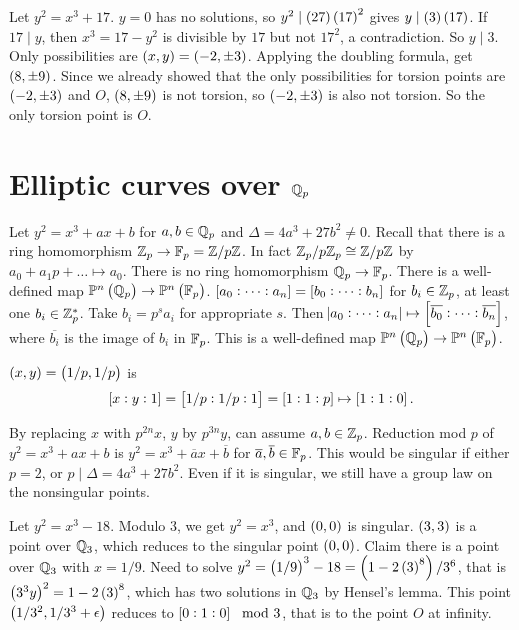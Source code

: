 \begin{example*}
Let $ y^2 = x^3 + 17 $. $ y = 0 $ has no solutions, so $ y^2 \mid \br{27}\br{17}^2 $ gives $ y \mid \br{3}\br{17} $. If $ 17 \mid y $, then $ x^3 = 17 - y^2 $ is divisible by $ 17 $ but not $ 17^2 $, a contradiction. So $ y \mid 3 $. Only possibilities are $ \br{x, y} = \br{-2, \pm 3} $. Applying the doubling formula, get $ \br{8, \pm 9} $. Since we already showed that the only possibilities for torsion points are $ \br{-2, \pm 3} $ and $ O $, $ \br{8, \pm 9} $ is not torsion, so $ \br{-2, \pm 3} $ is also not torsion. So the only torsion point is $ O $.
\end{example*}

\pagebreak

\section{Elliptic curves over $ \mathbb{Q}_p $}


Let $ y^2 = x^3 + ax + b $ for $ a, b \in \mathbb{Q}_p $ and $ \Delta = 4a^3 + 27b^2 \ne 0 $. Recall that there is a ring homomorphism $ \mathbb{Z}_p \to \mathbb{F}_p = \mathbb{Z} / p\mathbb{Z} $. In fact $ \mathbb{Z}_p / p\mathbb{Z}_p \cong \mathbb{Z} / p\mathbb{Z} $ by $ a_0 + a_1p + \dots \mapsto a_0 $. There is no ring homomorphism $ \mathbb{Q}_p \to \mathbb{F}_p $. There is a well-defined map $ \P^n\br{\Q_p} \to \P^n\br{\F_p} $. $ \sbr{a_0 : \dots : a_n} = \sbr{b_0 : \dots : b_n} $ for $ b_i \in \mathbb{Z}_p $, at least one $ b_i \in \mathbb{Z}_p^* $. Take $ b_i = p^sa_i $ for appropriate $ s $. Then $ \abs{a_0 : \dots : a_n} \mapsto \sbr{\overline{b_0} : \dots : \overline{b_n}} $, where $ \overline{b_i} $ is the image of $ b_i $ in $ \mathbb{F}_p $. This is a well-defined map $ \P^n\br{\Q_p} \to \P^n\br{\F_p} $.

\begin{example*}
$ \br{x, y} = \br{1 / p, 1 / p} $ is
$$ \sbr{x : y : 1} = \sbr{1 / p : 1 / p : 1} = \sbr{1 : 1 : p} \mapsto \sbr{1 : 1 : 0}. $$
\end{example*}

By replacing $ x $ with $ p^{2n}x $, $ y $ by $ p^{3n}y $, can assume $ a, b \in \mathbb{Z}_p $. Reduction mod $ p $ of $ y^2 = x^3 + ax + b $ is $ y^2 = x^3 + \overline{a}x + \overline{b} $ for $ \overline{a}, \overline{b} \in \mathbb{F}_p $. This would be singular if either $ p = 2 $, or $ p \mid \Delta = 4a^3 + 27b^2 $. Even if it is singular, we still have a group law on the nonsingular points.

\begin{example*}
Let $ y^2 = x^3 - 18 $. Modulo $ 3 $, we get $ y^2 = x^3 $, and $ \br{0, 0} $ is singular. $ \br{3, 3} $ is a point over $ \mathbb{Q}_3 $, which reduces to the singular point $ \br{0, 0} $. Claim there is a point over $ \mathbb{Q}_3 $ with $ x = 1 / 9 $. Need to solve $ y^2 = \br{1 / 9}^3 - 18 = \br{1 - 2\br{3}^8} / 3^6 $, that is $ \br{3^3y}^2 = 1 - 2\br{3}^8 $, which has two solutions in $ \mathbb{Q}_3 $ by Hensel's lemma. This point $ \br{1 / 3^2, 1 / 3^3 + \epsilon} $ reduces to $ \sbr{0 : 1 : 0} \mod 3 $, that is to the point $ O $ at infinity.
\end{example*}

